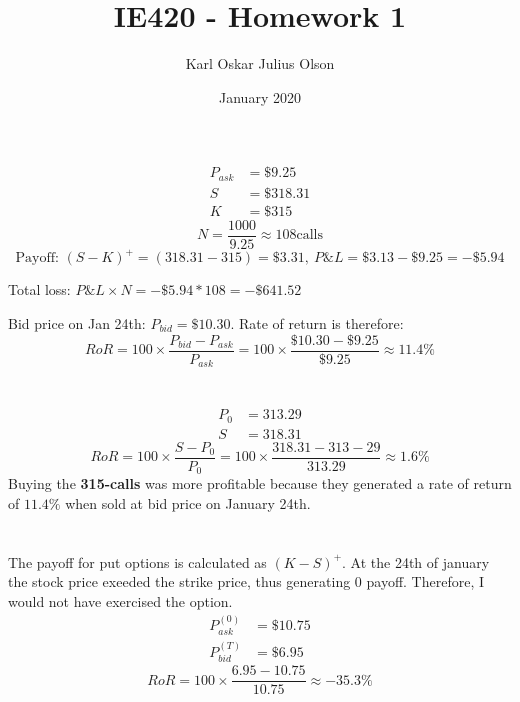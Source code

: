 \documentclass{article}
\title{IE420 - Homework 1}
\author{Karl Oskar Julius Olson}
\date{January 2020}
\begin{document}
\thispagestyle{fancy}

\section{}
\begin{align*}
	P_{ask} &= \$9.25 \\
	S &= \$318.31 \\
	K &= \$315
\end{align*}
$$N = \frac{1000}{9.25} \approx 108  \text{calls}$$
$$\text{Payoff: } (S-K)^+ = (318.31 - 315) = \$3.31, \ P\&L = \$3.13-\$9.25 = -\$5.94$$

Total loss: $P\&L \times N = -\$5.94 * 108 = -\$641.52$

Bid price on Jan 24th: $P_{bid} = \$10.30$. Rate of return is therefore: $$RoR = 100 \times \frac{P_{bid}-P_{ask}}{P_{ask}} = 100 \times \frac{\$10.30-\$9.25}{\$9.25} \approx 11.4\%$$

\section{}

\begin{align*}
	P_0 &= 313.29 \\
	S &= 318.31
\end{align*}
$$RoR = 100 \times \frac{S-P_0}{P_0} = 100 \times \frac{318.31-313-29}{313.29} \approx 1.6\%$$
Buying the \textbf{315-calls} was more profitable because they generated a rate of return of $11.4\%$ when sold at bid price on January 24th. 

\section{}

The payoff for put options is calculated as $(K-S)^+$. At the 24th of january the stock price exeeded the strike price, thus generating 0 payoff. Therefore, I would not have exercised the option.
\begin{align*}
	P_{ask}^{(0)} &= \$10.75 \\
	P_{bid}^{(T)} &= \$6.95
\end{align*}
$$RoR = 100 \times \frac{6.95-10.75}{10.75} \approx -35.3 \%$$

\section{}
\end{document}
